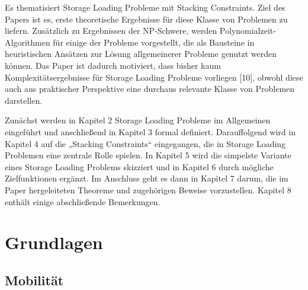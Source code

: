 \documentclass[12pt, a4paper]{article}
\begin{document}
Es thematisiert Storage Loading Probleme mit Stacking Constraints.
Ziel des Papers ist es, erste theoretische Ergebnisse für diese
Klasse von Problemen zu liefern. Zusätzlich zu Ergebnissen der NP-Schwere, werden
Polynomialzeit-Algorithmen für einige der Probleme vorgestellt, die als Bausteine in
heuristischen Ansätzen zur Lösung allgemeinerer Probleme genutzt werden können.
Das Paper ist dadurch motiviert, dass bisher kaum Komplexitätsergebnisse für Storage
Loading Probleme vorliegen [10], obwohl diese auch aus praktischer Perspektive eine
durchaus relevante Klasse von Problemen darstellen.

Zunächst werden in Kapitel 2 Storage Loading Probleme im Allgemeinen eingeführt
und anschließend in Kapitel 3 formal definiert. Darauffolgend wird in Kapitel 4 auf die
„Stacking Constraints“ eingegangen, die in Storage Loading Problemen eine zentrale
Rolle spielen. In Kapitel 5 wird die simpelste Variante eines Storage Loading Problems
skizziert und in Kapitel 6 durch mögliche Zielfunktionen ergänzt. Im Anschluss geht
es dann in Kapitel 7 darum, die im Paper hergeleiteten Theoreme und zugehörigen
Beweise vorzustellen. Kapitel 8 enthält einige abschließende Bemerkungen.

\pagebreak


\section{Grundlagen}

\subsection{Mobilität}
\label{sec:mobility}
\end{document}
